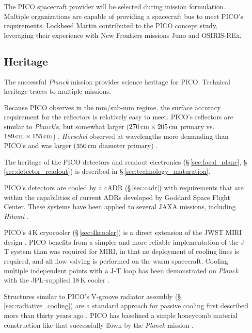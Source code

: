 The PICO spacecraft provider will be selected during mission
formulation. Multiple organizations are capable of providing a
spacecraft bus to meet PICO's requirements. Lockheed Martin
contributed to the PICO concept study, leveraging their experience
with New Frontiers missions Juno and OSIRIS-REx.
 
\subsection{Heritage}
\label{sec:heritage} %

The successful \textit{Planck} mission provides science heritage for
PICO. Technical heritage traces to multiple missions.

Because PICO observes in the mm/sub-mm regime, the surface accuracy
requirement for the reflectors is relatively easy to meet. PICO's
reflectors are similar to \textit{Planck}'s, but somewhat larger
($270\,{\rm cm} \times 205\,{\rm cm}$ primary vs.\
$189\,{\rm cm} \times 155\,{\rm cm}$)
\citep{Gloesener2006}. \textit{Herschel} observed at wavelengths more
demanding than PICO's and was larger ($350\,{\rm cm}$ diameter
primary) \citep{Toulemont2004}.

The heritage of the PICO detectors and readout electronics
(\S\,\ref{sec:focal_plane}, \S\,\ref{sec:detector_readout}) is
described in \S\,\ref{sec:technology_maturation}.


PICO's detectors are cooled by a cADR (\S\,\ref{sec:cadr}) with
requirements that are within the capabilities of current ADRs
developed by Goddard Space Flight Center. These systems have been
applied to several JAXA missions, including \textit{Hitomi} \citep{Shirron2016}.

PICO's 4\,K cryocooler (\S\,\ref{sec:4kcooler}) is a direct extension
of the JWST MIRI design \citep{Durand2008,Rabb2013}. PICO benefits
from a simpler and more reliable implementation of the J-T system than
was required for MIRI, in that no deployment of cooling lines is
required, and all flow valving is performed on the warm
spacecraft. Cooling multiple independent points with a J-T loop has
been demonstrated on \textit{Planck} with the JPL-supplied 18\,K
cooler \citep{Planck2011}.

Structures similar to PICO's V-groove radiator assembly
(\S\,\ref{sec:radiative_cooling}) are a standard approach for passive
cooling first described more than thirty years ago
\citep{Bard1987}.
PICO
has baselined a simple honeycomb material construction like that
successfully flown by the \textit{Planck} mission
\citep{ESA2009,Planck2011}.

